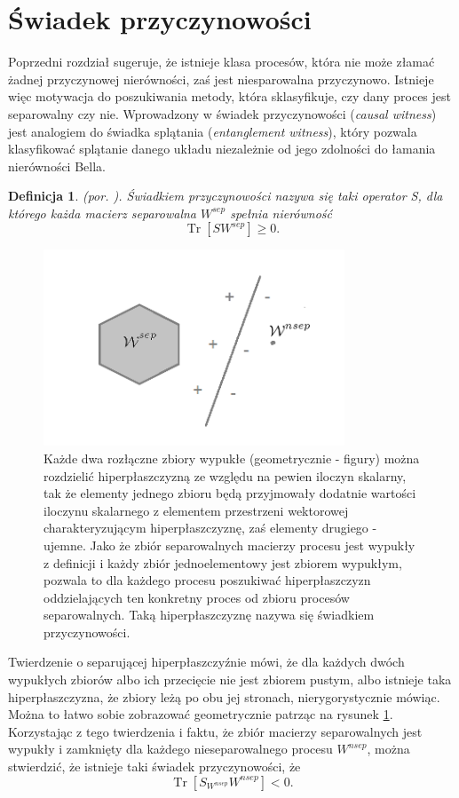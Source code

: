 \documentclass[10pt]{article} %
\newtheorem{definicja}{Definicja}
\DeclareMathOperator{\Trs}{Tr}
\begin{document}
\section{Świadek przyczynowości} 
Poprzedni rozdział sugeruje, że istnieje klasa procesów, która nie może złamać żadnej przyczynowej nierówności, zaś jest niesparowalna przyczynowo. Istnieje więc motywacja do poszukiwania metody, która sklasyfikuje, czy dany proces jest separowalny czy nie. Wprowadzony w \cite{causal_witness}
świadek przyczynowości (\textit{causal witness}) jest analogiem do świadka splątania (\textit{entanglement witness}), który pozwala klasyfikować splątanie danego układu niezależnie od jego zdolności do łamania nierówności Bella. 
\begin{definicja}
(por. \cite{causal_witness}).
Świadkiem przyczynowości nazywa się taki operator S, dla którego każda macierz separowalna $W^{sep}$ spełnia nierówność
\begin{equation}
\label{eq:witness_gez}
\Trs\left[S W^{sep} \right]\geq 0.
\end{equation}
\end{definicja}
\begin{figure}[t]
\centering
\includegraphics[width=0.8\textwidth]{obrazki/hip}
\caption{Każde dwa rozłączne zbiory wypukłe (geometrycznie - figury) można rozdzielić hiperpłaszczyzną ze względu na pewien iloczyn skalarny, tak że elementy jednego zbioru będą przyjmowały dodatnie wartości iloczynu skalarnego z elementem przestrzeni wektorowej charakteryzującym hiperpłaszczyznę, zaś elementy drugiego - ujemne. Jako że zbiór separowalnych macierzy procesu jest wypukły z definicji i każdy zbiór jednoelementowy jest zbiorem wypukłym, pozwala to dla każdego procesu poszukiwać hiperpłaszczyzn oddzielających ten konkretny proces od zbioru procesów separowalnych. Taką hiperpłaszczyznę nazywa się świadkiem przyczynowości.
}
\label{fig:hip}
\end{figure}
Twierdzenie o separującej hiperpłaszczyźnie mówi, że dla każdych dwóch wypukłych zbiorów albo ich przecięcie nie jest zbiorem pustym, albo istnieje taka hiperpłaszczyzna, że zbiory leżą po obu jej stronach, nierygorystycznie mówiąc. Można to łatwo sobie zobrazować geometrycznie patrząc na rysunek \ref{fig:hip}. Korzystając z tego twierdzenia i faktu, że zbiór macierzy separowalnych jest wypukły i zamknięty dla każdego nieseparowalnego procesu $W^{nsep}$, można stwierdzić, że istnieje taki świadek przyczynowości, że 
\begin{equation}
\Trs \left[ S_{W^{nsep}} W^{nsep} \right] < 0.
\end{equation}
\end{document}
